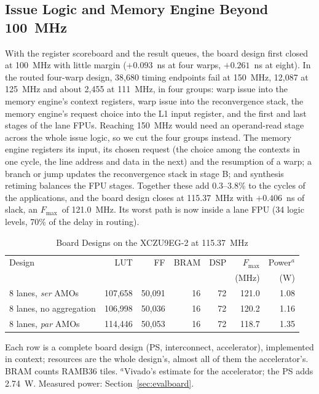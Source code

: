 \documentclass[journal]{IEEEtran}
\newcommand{\Fmax}{$F_{\max}$}
\begin{document}
\subsection{Issue Logic and Memory Engine Beyond 100~MHz}\label{sec:clock}
With the register scoreboard and the result queues, the board design first closed
at 100~MHz with little margin ($+0.093$~ns at four warps, $+0.261$~ns at eight).
In the routed four-warp design, 38,680 timing endpoints fail at 150~MHz, 12,087 at 125~MHz and about 2,455 at 111~MHz, in four
groups: warp issue into the memory engine's context registers, warp issue into
the reconvergence stack, the memory engine's request choice into the L1 input
register, and the first and last stages of the lane FPUs. Reaching 150~MHz would
need an operand-read stage across the whole issue logic, so we cut the four
groups instead. The memory engine registers its input, its chosen request (the
choice among the contexts in one cycle, the line address and data in the next)
and the resumption of a warp; a branch or jump updates the reconvergence stack in
stage B; and synthesis retiming balances the FPU stages. Together these add
0.3--3.8\% to the cycles of the applications, and the board design closes at
115.37~MHz with $+0.406$~ns of slack, an \Fmax\ of 121.0~MHz. Its worst path is
now inside a lane FPU (34 logic levels, 70\% of the delay in routing).

\begin{table}[t]
\caption{Board Designs on the XCZU9EG-2 at 115.37~MHz}
\label{tab:impl}
\centering\footnotesize
\setlength{\tabcolsep}{2.4pt}
\begin{tabular}{lrrrrrr}
\toprule
Design & LUT & FF & BRAM & DSP & \Fmax & Power$^a$\\
 & & & & & (MHz) & (W)\\
\midrule
8 lanes, \emph{ser} AMOs   & 107,658 & 50,091 & 16 & 72 & 121.0 & 1.08\\
8 lanes, no aggregation    & 106,998 & 50,036 & 16 & 72 & 120.2 & 1.16\\
8 lanes, \emph{par} AMOs   & 114,446 & 50,053 & 16 & 72 & 118.7 & 1.35\\
\bottomrule
\end{tabular}

\vspace{2pt}
\begin{minipage}{\columnwidth}\footnotesize
Each row is a complete board design (PS, interconnect, accelerator), implemented
in context; resources are the whole design's, almost all of them the
accelerator's. BRAM counts RAMB36 tiles. $^a$Vivado's estimate for the
accelerator; the PS adds 2.74~W. Measured power: Section~\ref{sec:evalboard}.
\end{minipage}
\end{table}
\end{document}
